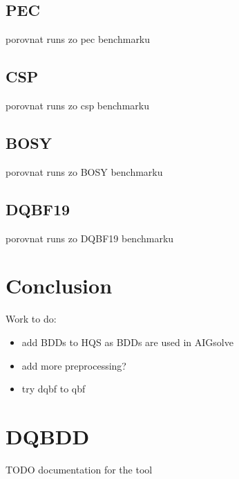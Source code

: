 \documentclass[
  digital, %
  color,
  twoside, %
  table,   %
  nolof,     %
  nolot,     %
]{fithesis3}
\theoremstyle{definition}
\theoremstyle{remark}
\begin{document}
\section{PEC}
porovnat runs zo pec benchmarku

\section{CSP}
porovnat runs zo csp benchmarku

\section{BOSY}
porovnat runs zo BOSY benchmarku

\section{DQBF19}
porovnat runs zo DQBF19 benchmarku

\chapter{Conclusion}
Work to do:
\begin{itemize}
    \item add BDDs to HQS as BDDs are used in AIGsolve
    \item add more preprocessing?
    \item try dqbf to qbf 
\end{itemize}

\begingroup
\setlength{\emergencystretch}{8em}
\printbibliography[heading=bibintoc]
\endgroup



\appendix %
\chapter{DQBDD}
\label{appendix:DQBDD}
TODO documentation for the tool 
\end{document}
